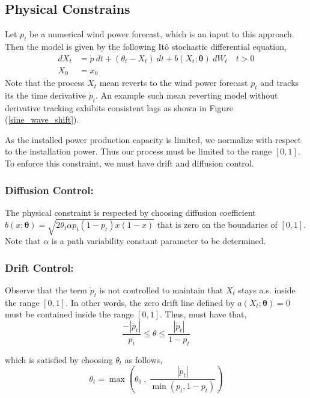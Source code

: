 \documentclass[10pt,twocolumn,letterpaper]{article}
\begin{document}
\subsection{Physical Constrains}

Let $p_t$ be a numerical wind power forecast, which is an input to this approach. Then the model is given by the following It\^{o} stochastic differential equation,
\begin{equation}
\begin{split}
dX_t&= \dot{p} \ dt + (\theta_t -X_t) \ dt + b (X_t; \bm{\theta} ) \ dW_t \quad t > 0 \\
X_0&=x_0
\end{split}
\end{equation}
Note that the process $X_t$ mean reverts to  the wind power forecast $p_t$ and  tracks its the time derivative $\dot{p}_t$.  An example such mean reverting model without derivative tracking exhibits consistent lags as shown in Figure (\ref{sine_wave_shift}).

As the  installed power production capacity is limited, we normalize with respect to the installation power. Thus our process must be limited to the range $[0,1]$. To enforce this constraint, we must have drift and diffusion control.
\subsubsection*{Diffusion Control: } The physical constraint is respected  by choosing  diffusion coefficient $ b (x; \bm{\theta} )= \sqrt{2 \theta_t \alpha p_t(1-p_t) x (1-x)} $ that is zero on the boundaries of $[0,1]$. Note that $\alpha$ is a path variability constant parameter to be determined.
\subsubsection*{Drift Control: }

Observe that the term $\dot{p}_t $ is not controlled to maintain that $X_t$ stays a.s.  inside the range $[0,1]$. In other words, the zero drift line defined by $a(X_t; \bm{\theta}) =0$ must  be contained inside the range $[0,1]$. Thus, must have that, 
\begin{equation}
\frac{- |\dot{p_t}|}{p_t} \leq \theta \leq \frac{|\dot{p}_t|}{1- p_t}
\end{equation}

which is satisfied  by choosing $\theta_t$ as follows, 
\begin{equation}
\theta_t = \max \left( \theta_0 \ , \ \frac{|\dot{p}_t|}{\min (p_t, 1-p_t)}  \right ) \label{theta_t}
\end{equation}
\end{document}

